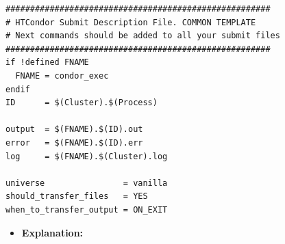 \documentclass[a4paper,10pt]{article}
\begin{document}
\begin{verbatim}
######################################################
# HTCondor Submit Description File. COMMON TEMPLATE   
# Next commands should be added to all your submit files   
######################################################
if !defined FNAME
  FNAME = condor_exec
endif
ID      = $(Cluster).$(Process)

output  = $(FNAME).$(ID).out
error   = $(FNAME).$(ID).err
log     = $(FNAME).$(Cluster).log

universe                = vanilla
should_transfer_files   = YES
when_to_transfer_output = ON_EXIT
\end{verbatim}

\begin{itemize}
\item \textbf{Explanation:}


\end{itemize}
\end{document}
